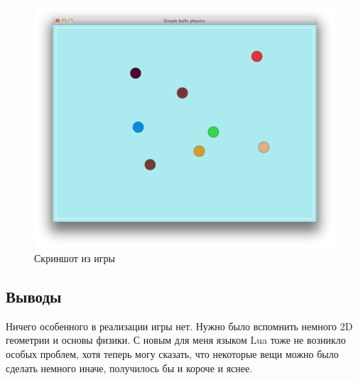 \documentclass[12pt]{article}
\begin{document}
\begin{figure}[!htb]
  \centering
    \includegraphics[scale=0.5]{pics/game.png}
   \caption{Скриншот из игры}
    \label{fig:game}
\end{figure}

\subsection*{Выводы}
Ничего особенного в реализации игры нет. Нужно было вспомнить немного 2D геометрии и основы
физики. С новым для меня языком Lua тоже не возникло особых проблем, хотя теперь могу сказать,
что некоторые вещи можно было сделать немного иначе, получилось бы и короче и яснее.
\end{document}
